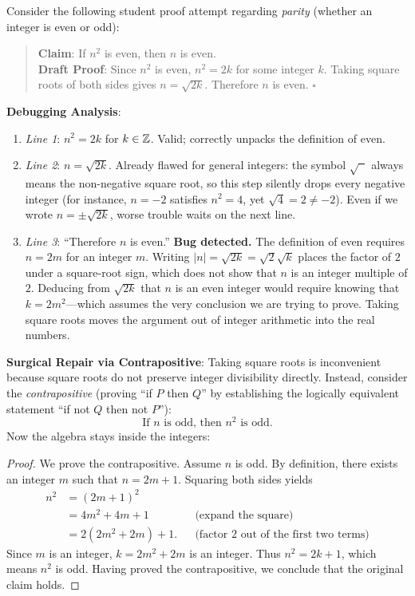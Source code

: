 Consider the following student proof attempt regarding \emph{parity} (whether an integer is even or odd):

\begin{quote}
\textbf{Claim}: If $n^2$ is even, then $n$ is even. \\
\textbf{Draft Proof}: Since $n^2$ is even, $n^2 = 2k$ for some integer $k$. Taking square roots of both sides gives $n = \sqrt{2k}$. Therefore $n$ is even. \hfill $\square$
\end{quote}

\textbf{Debugging Analysis}:
\begin{enumerate}
\item \emph{Line 1}: $n^2 = 2k$ for $k \in \mathbb{Z}$. Valid; correctly unpacks the definition of even.
\item \emph{Line 2}: $n = \sqrt{2k}$. Already flawed for general integers: the symbol $\sqrt{\phantom{x}}$ always means the non-negative square root, so this step silently drops every negative integer (for instance, $n = -2$ satisfies $n^2 = 4$, yet $\sqrt{4} = 2 \neq -2$). Even if we wrote $n = \pm\sqrt{2k}$, worse trouble waits on the next line.
\item \emph{Line 3}: ``Therefore $n$ is even.'' \textbf{Bug detected.} The definition of even requires $n = 2m$ for an integer $m$. Writing $|n| = \sqrt{2k} = \sqrt{2}\sqrt{k}$ places the factor of $2$ under a square-root sign, which does not show that $n$ is an integer multiple of $2$. Deducing from $\sqrt{2k}$ that $n$ is an even integer would require knowing that $k = 2m^2$---which assumes the very conclusion we are trying to prove. Taking square roots moves the argument out of integer arithmetic into the real numbers.
\end{enumerate}

\textbf{Surgical Repair via Contrapositive}:
Taking square roots is inconvenient because square roots do not preserve integer divisibility directly. Instead, consider the \emph{contrapositive} (proving ``if $P$ then $Q$'' by establishing the logically equivalent statement ``if not $Q$ then not $P$''):
\[
\text{If } n \text{ is odd, then } n^2 \text{ is odd.}
\]
Now the algebra stays inside the integers:
\begin{proof}
We prove the contrapositive. Assume $n$ is odd. By definition, there exists an integer $m$ such that $n = 2m + 1$. Squaring both sides yields
\begin{align*}
n^2 &= (2m + 1)^2 \\
    &= 4m^2 + 4m + 1 && \text{(expand the square)} \\
    &= 2(2m^2 + 2m) + 1. && \text{(factor $2$ out of the first two terms)}
\end{align*}
Since $m$ is an integer, $k = 2m^2 + 2m$ is an integer. Thus $n^2 = 2k + 1$, which means $n^2$ is odd. Having proved the contrapositive, we conclude that the original claim holds.
\end{proof}

